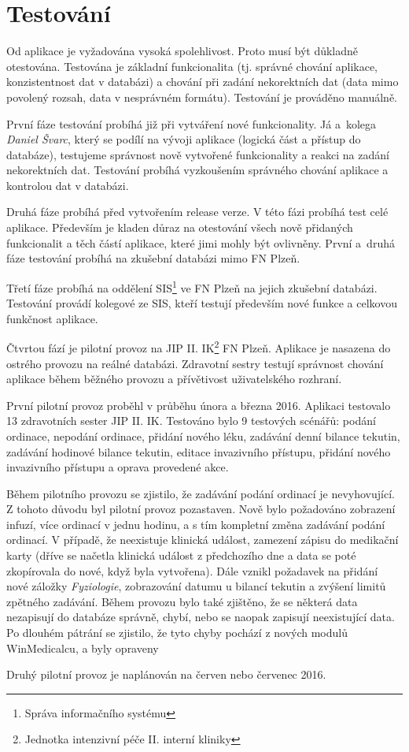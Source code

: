 \chapter{Testování}
\label{ch:test}

Od aplikace je vyžadována vysoká spolehlivost. Proto musí být důkladně otestována. Testována je základní funkcionalita (tj. správné chování aplikace, konzistentnost dat v databázi) a chování při zadání nekorektních dat (data mimo povolený rozsah, data v nesprávném formátu). Testování je prováděno manuálně.

První fáze testování probíhá již při vytváření nové funkcionality. Já a~kolega \emph{Daniel Švarc}, který se podílí na vývoji aplikace (logická část a přístup do databáze), testujeme správnost nově vytvořené funkcionality a reakci na zadání nekorektních dat. Testování probíhá vyzkoušením správného chování aplikace a kontrolou dat v databázi.

Druhá fáze probíhá před vytvořením release verze. V této fázi probíhá test celé aplikace. Především je kladen důraz na otestování všech nově přidaných funkcionalit a těch částí aplikace, které jimi mohly být ovlivněny. První a~druhá fáze testování probíhá na zkušební databázi mimo FN Plzeň.

Třetí fáze probíhá na oddělení SIS\footnote{Správa informačního systému} ve FN Plzeň na jejich zkušební databázi. Testování provádí kolegové ze SIS, kteří testují především nové funkce a celkovou funkčnost aplikace.

Čtvrtou fází je pilotní provoz na JIP II. IK\footnote{Jednotka intenzivní péče II. interní kliniky} FN Plzeň. Aplikace je nasazena do ostrého provozu na reálné databázi. Zdravotní sestry testují správnost chování aplikace během běžného provozu a přívětivost uživatelského rozhraní.

První pilotní provoz proběhl v průběhu února a března 2016. Aplikaci testovalo 13 zdravotních sester JIP II. IK. Testováno bylo 9 testových scénářů: podání ordinace, nepodání ordinace, přidání nového léku, zadávání denní bilance tekutin, zadávání hodinové bilance tekutin, editace invazivního přístupu, přidání nového invazivního přístupu a oprava provedené akce.

Během pilotního provozu se zjistilo, že zadávání podání ordinací je nevyhovující. Z tohoto důvodu byl pilotní provoz pozastaven. Nově bylo požadováno zobrazení infuzí, více ordinací v jednu hodinu, a s tím kompletní změna zadávání podání ordinací. V případě, že neexistuje klinická událost, zamezení zápisu do medikační karty (dříve se načetla klinická událost z předchozího dne a data se poté zkopírovala do nové, když byla vytvořena).  Dále vznikl požadavek na přidání nové záložky \emph{Fyziologie}, zobrazování datumu u bilancí tekutin a zvýšení limitů zpětného zadávání. Během provozu bylo také zjištěno, že se některá data nezapisují do databáze správně, chybí, nebo se naopak zapisují neexistující data. Po dlouhém pátrání se zjistilo, že tyto chyby pochází z nových modulů WinMedicalcu, a byly opraveny

Druhý pilotní provoz je naplánován na červen nebo červenec 2016.
